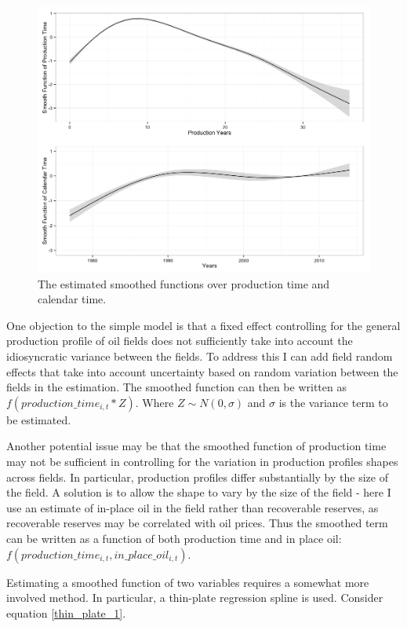 \documentclass[12pt]{article}
\begin{document}
\begin{figure}
	\includegraphics[width=1\textwidth]{figures/smooths.png}
	\caption{The estimated smoothed functions over production time and calendar time.}
	\label{smooths}
\end{figure}

One objection to the simple model is that a fixed effect controlling for the general production profile of oil fields does not sufficiently take into account the idiosyncratic variance between the fields. To address this I can add field random effects that take into account uncertainty based on random variation between the fields in the estimation. The smoothed function can then be written as $f(production\_time_{i,t}*Z)$.  Where $Z \sim N(0, \sigma)$ and $\sigma$ is the variance term to be estimated.  

Another potential issue may be that the smoothed function of production time may not be sufficient in controlling for the variation in production profiles shapes across fields.  In particular, production profiles differ substantially by the size of the field. A solution is to allow the shape to vary by the size of the field - here I use an estimate of in-place oil in the field rather than recoverable reserves, as recoverable reserves may be correlated with oil prices.  Thus the smoothed term can be written as a function of both production time and in place oil: $f(production\_time_{i,t}, in\_place\_oil_{i,t})$.

Estimating a smoothed function of two variables requires a somewhat more involved method.  In particular, a thin-plate regression spline \citep{wood_thin_2003} is used. Consider equation \ref{thin_plate_1}. 
\end{document}
